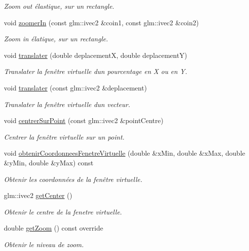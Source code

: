 \begin{DoxyCompactItemize}
\begin{DoxyCompactList}\small\item\em Zoom out élastique, sur un rectangle. \end{DoxyCompactList}\item 
void \hyperlink{classvue_1_1_projection_ortho_a54482116f4c588f0404bc1a80926ab06}{zoomer\+In} (const glm\+::ivec2 \&coin1, const glm\+::ivec2 \&coin2)
\begin{DoxyCompactList}\small\item\em Zoom in élatique, sur un rectangle. \end{DoxyCompactList}\item 
void \hyperlink{classvue_1_1_projection_ortho_ab0b91a56bb059b3cb53c53c196fa9ad8}{translater} (double deplacement\+X, double deplacement\+Y)
\begin{DoxyCompactList}\small\item\em Translater la fenêtre virtuelle d\textquotesingle{}un pourcentage en {\itshape X} ou en {\itshape Y}. \end{DoxyCompactList}\item 
void \hyperlink{classvue_1_1_projection_ortho_af54b17d42826b1ebb396edf22ff66811}{translater} (const glm\+::ivec2 \&deplacement)
\begin{DoxyCompactList}\small\item\em Translater la fenêtre virtuelle d\textquotesingle{}un vecteur. \end{DoxyCompactList}\item 
void \hyperlink{classvue_1_1_projection_ortho_a8f50a13c2cd734d7a2b58c9bb1e5b89d}{centrer\+Sur\+Point} (const glm\+::ivec2 \&point\+Centre)
\begin{DoxyCompactList}\small\item\em Centrer la fenêtre virtuelle sur un point. \end{DoxyCompactList}\item 
void \hyperlink{classvue_1_1_projection_ortho_a6e2fe7110bcaa89dd4b10ba59aa3e72b}{obtenir\+Coordonnees\+Fenetre\+Virtuelle} (double \&x\+Min, double \&x\+Max, double \&y\+Min, double \&y\+Max) const 
\begin{DoxyCompactList}\small\item\em Obtenir les coordonnées de la fenêtre virtuelle. \end{DoxyCompactList}\item 
glm\+::ivec2 \hyperlink{classvue_1_1_projection_ortho_a84f149bf5b3cf035fff242081d64d90f}{get\+Center} ()
\begin{DoxyCompactList}\small\item\em Obtenir le centre de la fenetre virtuelle. \end{DoxyCompactList}\item 
double \hyperlink{classvue_1_1_projection_ortho_a70ed326d5c87427432b9e61cdbfa46cc}{get\+Zoom} () const  override
\begin{DoxyCompactList}\small\item\em Obtenir le niveau de zoom. \end{DoxyCompactList}\end{DoxyCompactItemize}
